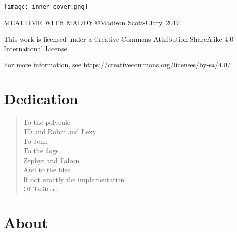 \documentclass{memoir}
\begin{document}
\frontmatter

\pagestyle{empty}
\texttt{[image: inner-cover.png]}
\newpage

\null
\vfill

\titlefont MEALTIME WITH MADDY \copyright Madison Scott-Clary, 2017

\vspace{1ex}

This work is licensed under a Creative Commons Attribution-ShareAlike 4.0 International License

\vspace{1ex}

For more information, see \mbox{\urlfont https://creativecommons.org/licenses/by-sa/4.0/}

\vfill
\newpage

\pagestyle{fancyplain}
\tableofcontents*

\normalfont

\chapter*{Dedication}

\begin{verse}
  To the polycule\\
  \vin JD and Robin and Lexy\\
  To Jenn\\
  To the dogs\\
  \vin Zephyr and Falcon\\
  And to the idea\\
  \vin If not exactly the implementation\\
  \vin \vin Of Twitter.
\end{verse}

\chapter[About]{About}

\mainmatter














\end{document}
